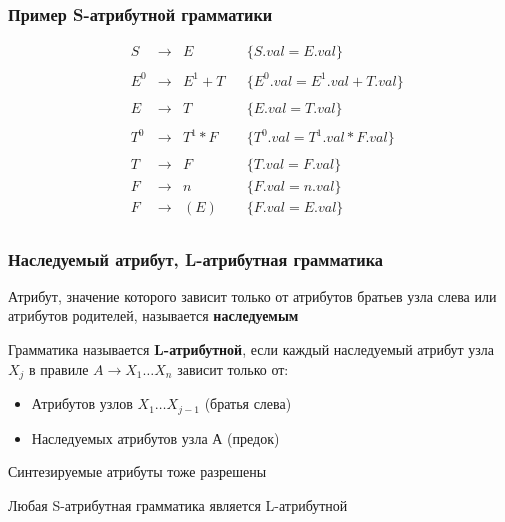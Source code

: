 \documentclass{beamer}
\begin{document}
\begin{frame}[fragile]
  \transwipe[direction=90]
  \frametitle{Пример S-атрибутной грамматики}
$$
\begin{array}{ccclll}
&S  & \rightarrow & E       &                                &\{S.val = E.val\}\\~\\

&E^0& \rightarrow & E^1 + T &                                &\{E^0.val = E^1.val + T.val\}\\~\\

&E  & \rightarrow & T       &                                &\{E.val = T.val\}\\~\\

&T^0& \rightarrow & T^1 * F &                                &\{T^0.val = T^1.val * F.val\}\\~\\

&T  & \rightarrow & F       &                                &\{T.val = F.val\}\\
&F  & \rightarrow & n       &                                &\{F.val = n.val\}\\
&F  & \rightarrow & (E)     &                                &\{F.val = E.val\}\\

\end{array}
$$
\end{frame}

\begin{frame}[fragile]
  \transwipe[direction=90]
  \frametitle{Наследуемый атрибут, L-атрибутная грамматика}
Атрибут, значение которого зависит только от атрибутов братьев узла слева или атрибутов родителей, называется \textbf{наследуемым}

\vfill

Грамматика называется \textbf{L-атрибутной}, если каждый наследуемый
атрибут узла $X_j$ в правиле $A \to X_1 \dots X_n$ зависит только от:

\begin{itemize}
  \item Атрибутов узлов $X_1 \dots X_{j-1}$ (братья слева)
  \item Наследуемых атрибутов узла $А$ (предок)
\end{itemize}

\vfill

Синтезируемые атрибуты тоже разрешены

\vfill

Любая S-атрибутная грамматика является L-атрибутной
\end{frame}
\end{document}
